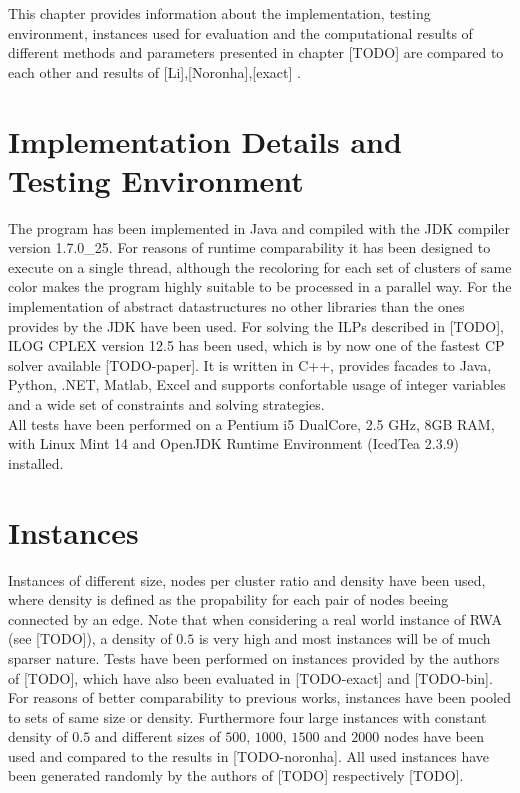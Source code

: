 This chapter provides information about the implementation, testing environment, instances used for evaluation and the computational results of different methods and parameters presented in chapter [TODO] are compared to each other and results of [Li],[Noronha],[exact] . 

\section{Implementation Details and Testing Environment}
The program has been implemented in Java and compiled with the JDK compiler version 1.7.0\_25. For reasons of runtime comparability it has been designed to execute on a single thread, although the recoloring for each set of clusters of same color makes the program highly suitable to be processed in a parallel way. For the implementation of abstract datastructures no other libraries than the ones provides by the JDK have been used. For solving the ILPs described in [TODO], ILOG CPLEX version 12.5 has been used, which is by now one of the fastest CP solver available [TODO-paper]. It is written in C++, provides facades to Java, Python, .NET, Matlab, Excel and supports confortable usage of integer variables and a wide set of constraints and solving strategies.\\
All tests have been performed on a Pentium i5 DualCore, 2.5 GHz, 8GB RAM, with Linux Mint 14 and OpenJDK Runtime Environment (IcedTea 2.3.9) installed.

\section{Instances}
Instances of different size, nodes per cluster ratio and density have been used, where density is defined as the propability for each pair of nodes beeing connected by an edge. Note that when considering a real world instance of RWA (see [TODO]), a density of $0.5$ is very high and most instances will be of much sparser nature. Tests have been performed on instances provided by the authors of [TODO], which have also been evaluated in [TODO-exact] and [TODO-bin]. For reasons of better comparability to previous works, instances have been pooled to sets of same size or density.
Furthermore four large instances with constant density of $0.5$ and different sizes of $500$, $1000$, $1500$ and $2000$ nodes have been used and compared to the results in [TODO-noronha]. All used instances have been generated randomly by the authors of [TODO] respectively [TODO].

